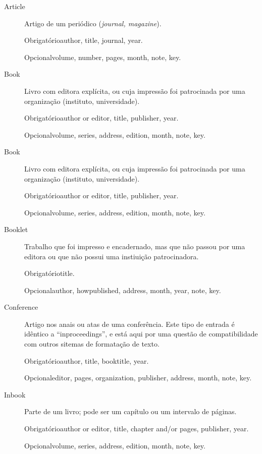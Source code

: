 \documentclass[article,openany]{memoir}
\newcommand{\obrigatorios}{%
   \par Obrigatório\dotfill\ignorespaces}
\newcommand{\opcionais}{
   \par Opcional\dotfill\ignorespaces}
\begin{document}
\begin{description}
\item[Article] 
Artigo de um periódico (\emph{journal, magazine}).

  \obrigatorios author, title, journal, year.

  \opcionais volume, number, pages, month, note, key.

\item[Book]
Livro com editora explícita, ou cuja impressão foi patrocinada por uma
organização (instituto, universidade).

  \obrigatorios author or editor, title, publisher, year.

  \opcionais volume, series, address, edition, month, note, key.

\item[Book]
Livro com editora explícita, ou cuja impressão foi patrocinada por uma
organização (instituto, universidade).

  \obrigatorios author or editor, title, publisher, year.

  \opcionais volume, series, address, edition, month, note, key.

\item[Booklet]
Trabalho que foi impresso e encadernado, mas que não passou por uma
editora ou que não possui uma instiuição patrocinadora.

  \obrigatorios title.

  \opcionais author, howpublished, address, month, year, note, key.

\item[Conference]
Artigo nos anais ou atas de uma conferência. Este tipo de entrada é
idêntico a ``inproceedings'', e está aqui por uma questão de
compatibilidade com outros sitemas de formatação de texto.

  \obrigatorios author, title, booktitle, year.

  \opcionais editor, pages, organization, publisher, address, month, note, key.


\item[Inbook]
Parte de um livro; pode ser um capítulo ou um intervalo de páginas.

  \obrigatorios author or editor, title, chapter and/or pages, publisher, year.

  \opcionais volume, series, address, edition, month, note, key.


\end{description}
\end{document}
